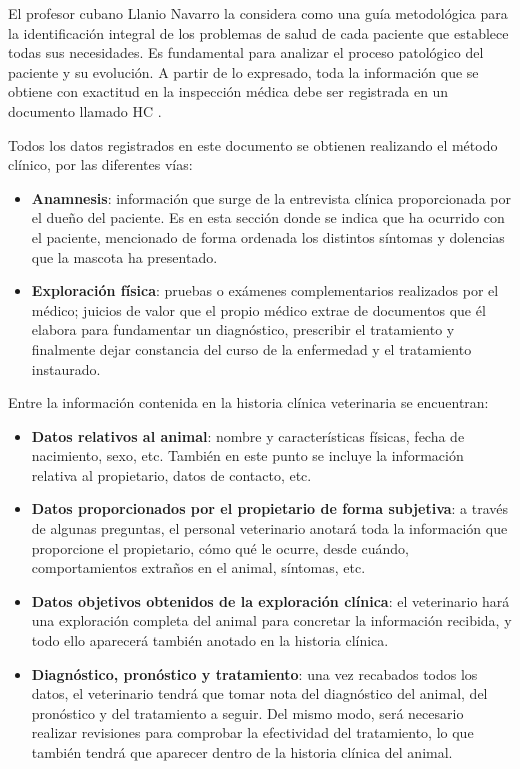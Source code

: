 El profesor cubano Llanio Navarro la considera como una guía metodológica para la identificación integral de los problemas de salud de cada paciente que establece todas sus necesidades. Es fundamental para analizar el proceso patológico del paciente y su evolución. A partir de lo expresado, toda la información que se obtiene con exactitud en la inspección médica debe ser registrada en un documento llamado HC . 

Todos los datos registrados en este documento se obtienen realizando el método clínico, por las diferentes vías:
\begin{itemize}
\item	\textbf{ Anamnesis}: información que surge de la entrevista clínica proporcionada por el dueño del paciente. Es en esta sección donde se indica que ha ocurrido con el paciente, mencionado de forma ordenada los distintos síntomas y dolencias que la mascota ha presentado.
\item	\textbf{ Exploración física}: pruebas o exámenes complementarios realizados por el médico; juicios de valor que el propio médico extrae de documentos que él elabora para fundamentar un diagnóstico, prescribir el tratamiento y finalmente dejar constancia del curso de la enfermedad y el tratamiento instaurado.
\end{itemize}


Entre la información contenida en la historia clínica veterinaria se encuentran:
\begin{itemize}


\item \textbf{ Datos relativos al animal}: nombre y características físicas, fecha de nacimiento, sexo, etc. También en este punto se incluye la información relativa al propietario, datos de contacto, etc.
\item \textbf{ Datos proporcionados por el propietario de forma subjetiva}: a través de algunas preguntas, el personal veterinario anotará toda la información que proporcione el propietario, cómo qué le ocurre, desde cuándo, comportamientos extraños en el animal, síntomas, etc.
\item \textbf{Datos objetivos obtenidos de la exploración clínica}: el veterinario hará una exploración completa del animal para concretar la información recibida, y todo ello aparecerá también anotado en la historia clínica.
\item \textbf{Diagnóstico, pronóstico y tratamiento}: una vez recabados todos los datos, el veterinario tendrá que tomar nota del diagnóstico del animal, del pronóstico y del tratamiento a seguir. Del mismo modo, será necesario realizar revisiones para comprobar la efectividad del tratamiento, lo que también tendrá que aparecer dentro de la historia clínica del animal.
\end{itemize}

